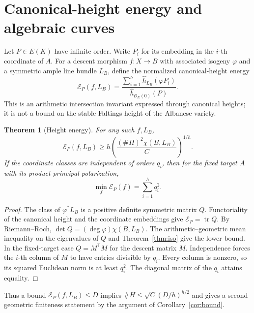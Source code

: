 \documentclass[11pt,a4paper]{article}
\newtheorem{theorem}{Theorem}[section]
\theoremstyle{definition}\newtheorem{definition}[theorem]{Definition}
\theoremstyle{remark}\newtheorem{remark}[theorem]{Remark}
\numberwithin{equation}{section}
\begin{document}
\section{Canonical-height energy and algebraic curves}
Let $P\in E(K)$ have infinite order. Write $P_i$ for its embedding in the $i$-th coordinate of $A$. For a descent morphism $f:X\to B$ with associated isogeny $\varphi$ and a symmetric ample line bundle $L_B$, define the normalized canonical-height energy
\[
\mathcal E_P(f,L_B)=\frac{\sum_{i=1}^h\widehat h_{L_B}(\varphi P_i)}{\widehat h_{\mathcal O_E(0)}(P)}.
\]
This is an arithmetic intersection invariant expressed through canonical heights; it is not a bound on the stable Faltings height of the Albanese variety.
\begin{theorem}[Height energy]\label{thm:energy}
For any such $f,L_B$,
\[
\mathcal E_P(f,L_B)\geq h\left(\frac{(\#H)^2\chi(B,L_B)}{C}\right)^{1/h}.
\]
If the coordinate classes are independent of orders $q_i$, then for the fixed target $A$ with its product principal polarization,
\begin{equation}\label{eq:energy}
\min_f\mathcal E_P(f)=\sum_{i=1}^h q_i^2.
\end{equation}
\end{theorem}
\begin{proof}
The class of $\varphi^*L_B$ is a positive definite symmetric matrix $Q$. Functoriality of the canonical height and the coordinate embeddings give $\mathcal E_P=\operatorname{tr}Q$. By Riemann--Roch, $\det Q=(\deg\varphi)\chi(B,L_B)$. The arithmetic--geometric mean inequality on the eigenvalues of $Q$ and Theorem~\ref{thm:iso} give the lower bound. In the fixed-target case $Q=M^{\mathsf T}M$ for the descent matrix $M$. Independence forces the $i$-th column of $M$ to have entries divisible by $q_i$. Every column is nonzero, so its squared Euclidean norm is at least $q_i^2$. The diagonal matrix of the $q_i$ attains equality.
\end{proof}
Thus a bound $\mathcal E_P(f,L_B)\leq D$ implies $\#H\leq\sqrt C(D/h)^{h/2}$ and gives a second geometric finiteness statement by the argument of Corollary~\ref{cor:bound}.
\end{document}
